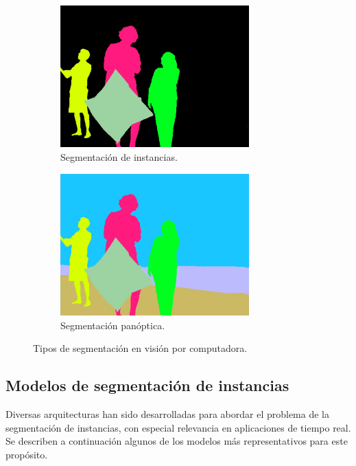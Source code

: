 \begin{figure}[htbp]
    \begin{subfigure}[b]{0.45\textwidth}
        \centering
        \includegraphics[width=0.8\textwidth]{figures/instance_segmentation.png}
        \caption{Segmentación de instancias.}
        \label{fig:segmentation_types_instance}
    \end{subfigure}
    \begin{subfigure}[b]{0.45\textwidth}
        \centering
        \includegraphics[width=0.8\textwidth]{figures/panoptic_segmentation.png}
        \caption{Segmentación panóptica.}
        \label{fig:segmentation_types_panoptic}
    \end{subfigure}
    \caption[Tipos de segmentación en visión por computadora]{Tipos de segmentación en visión por computadora.}
    \label{fig:segmentation_types}
\end{figure}

\subsection{Modelos de segmentación de instancias}
Diversas arquitecturas han sido desarrolladas para abordar el problema de la segmentación de instancias, con especial relevancia en aplicaciones de tiempo real. Se describen a continuación algunos de los modelos más representativos para este propósito.

